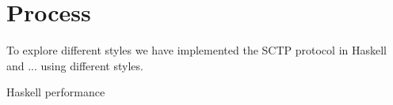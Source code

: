 \chapter{Process}
To explore different styles we have implemented the SCTP protocol\cite{_rfc_????} in Haskell and ... using different styles.

Haskell performance \cite{epstein_haskell_????}
